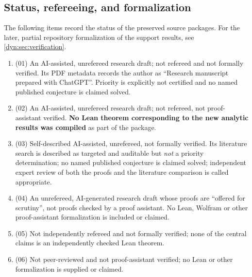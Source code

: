 \documentclass[11pt,letterpaper]{article}
\theoremstyle{definition}
\theoremstyle{remark}
\numberwithin{equation}{section}
\begin{document}
\subsection{Status, refereeing, and formalization}
The following items record the status of the preserved source packages.
For the later, partial repository formalization of the support results,
see \cref{dyn:sec:verification}.
\begin{enumerate}[label=\textbf{N\arabic*.},leftmargin=3.2em]
\item (01) An AI-assisted, unrefereed research draft; not refereed and not
formally verified. Its PDF metadata records the author as ``Research
manuscript prepared with ChatGPT''. Priority is explicitly not certified
and no named published conjecture is claimed solved.
\item (02) An AI-assisted, unrefereed research draft; not refereed, not
proof-assistant verified. \textbf{No Lean theorem corresponding to the new
analytic results was compiled} as part of the package.
\item (03) Self-described AI-assisted, unrefereed, not formally verified.
Its literature search is described as targeted and auditable but
\emph{not} a priority determination; no named published conjecture is
claimed solved; independent expert review of both the proofs and the
literature comparison is called appropriate.
\item (04) An unrefereed, AI-generated research draft whose proofs are
``offered for scrutiny'', not proofs checked by a proof assistant. No Lean,
Wolfram or other proof-assistant formalization is included or claimed.
\item (05) Not independently refereed and not formally verified; none of
the central claims is an independently checked Lean theorem.
\item (06) Not peer-reviewed and not proof-assistant verified; no Lean or
other formalization is supplied or claimed.
\end{enumerate}
\end{document}
